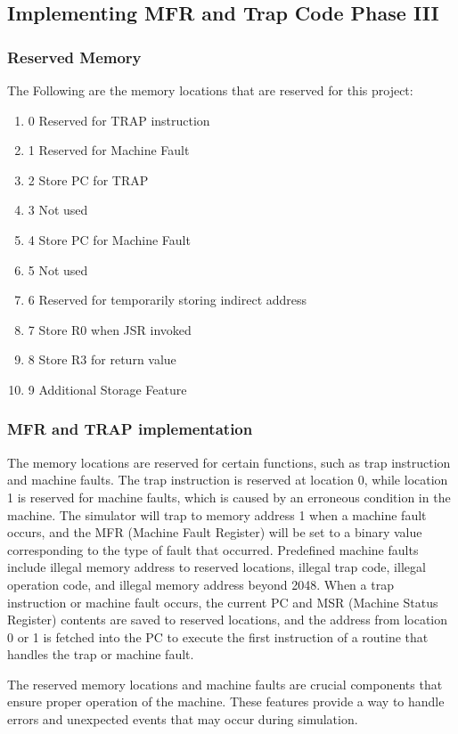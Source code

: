 \documentclass[10pt]{article}
\begin{document}
\subsection{Implementing MFR and Trap Code Phase III}
\subsubsection{Reserved Memory}
The Following are the memory locations that are reserved for this project:
\begin{enumerate}
  \item 0 Reserved for TRAP instruction
  \item 1 Reserved for Machine Fault
  \item 2 Store PC for TRAP
  \item 3 Not used
  \item 4 Store PC for Machine Fault
  \item 5 Not used
  \item 6 Reserved for temporarily storing indirect address
  \item 7 Store R0 when JSR invoked
  \item 8 Store R3 for return value
  \item 9 Additional Storage Feature
\end{enumerate}
\subsubsection{MFR and TRAP implementation}
The memory locations are reserved for certain functions, such as trap instruction and 
machine faults. The trap instruction is reserved at location 0, while location 
1 is reserved for machine faults, which is caused by an erroneous condition in the machine. 
The simulator will trap to memory address 1 when a machine fault occurs, and the MFR 
(Machine Fault Register) will be set to a binary value corresponding to the type of fault that 
occurred. Predefined machine faults include illegal memory address to reserved locations, 
illegal trap code, illegal operation code, and illegal memory address beyond 2048. When a trap 
instruction or machine fault occurs, the current PC and MSR (Machine Status Register) contents are 
saved to reserved locations, and the address from location 0 or 1 is fetched into the PC to execute 
the first instruction of a routine that handles the trap or machine fault.

The reserved memory locations and machine faults are crucial components that ensure proper operation 
of the machine. These features provide a way to handle errors and unexpected events that may occur 
during simulation. 
\end{document}
